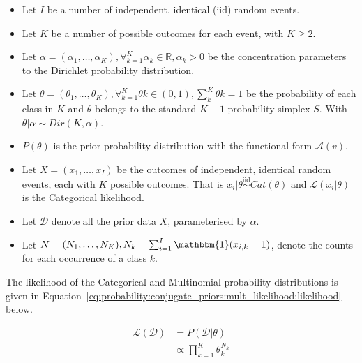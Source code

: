 \begin{itemize}
      \item Let $I$ be a number of independent, identical (iid) random events.

      \item Let $K$ be a number of possible outcomes for each event, with $K \geq 2$.

      \item Let $\alpha = (\alpha_{1}, \dots, \alpha_{K}), \forall_{k=1}^{K} \alpha_{k} \in \mathbb{R}, \alpha_{k} > 0$ be the concentration parameters to the Dirichlet probability distribution.

      \item Let $\theta = (\theta_{1}, \dots, \theta_{K}), \forall_{k=1}^{K} \theta{k} \in (0,1), \sum_{k}^{K} \theta{k} = 1$ be the probability of each class in $K$ and $\theta$ belongs to the standard $K-1$ probability simplex $S$. With $\theta | \alpha \sim Dir(K, \alpha)$.

      \item $P(\theta)$ is the prior probability distribution with the functional form $\mathcal{A}(v)$.

      \item Let $X = (x_{1}, \dots, x_{I})$ be the outcomes of independent, identical random events, each with $K$ possible outcomes. That is $x_{i} | \theta \overset{\text{iid}}{\sim} Cat(\theta)$ and $\mathcal{L}(x_{i} \vert \theta)$ is the Categorical likelihood.

      \item Let $\mathcal{D}$ denote all the prior data $X$, parameterised by $\alpha$.

      \item Let $N = (N_{1}, \dots, N_{K}), N_{k} = \sum_{i=1}^{I} \mathbbm{1}(x_{i,k} = 1)$, denote the counts for each occurrence of a class $k$.
\end{itemize}

The likelihood of the Categorical and Multinomial probability distributions is given in Equation~\eqref{eq:probability:conjugate_priors:mult_likelihood:likelihood} below.

\begin{equation}
      \label{eq:probability:conjugate_priors:mult_likelihood:likelihood}
      \begin{split}
            \mathcal{L}(\mathcal{D}) &=  P(\mathcal{D} | \theta) \\
            &\propto \prod_{k=1}^{K} \theta_{k}^{N_{k}}
      \end{split}
\end{equation}

